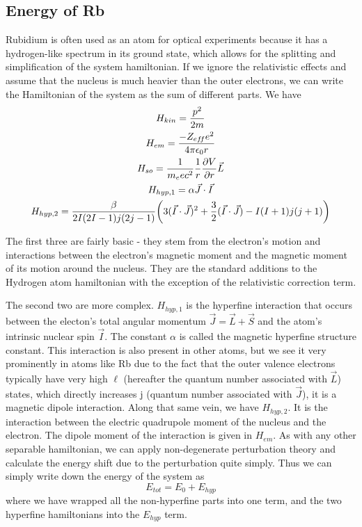 \documentclass{article}
\DeclarePairedDelimiter{\parens}{\lparen}{\rparen}
\begin{document}
  \subsection{Energy of Rb}
  Rubidium is often used as an atom for optical experiments because it has a hydrogen-like spectrum in its ground state, which allows for the splitting and simplification of the system hamiltonian.  If we ignore the relativistic effects and assume that the nucleus is much heavier than the outer electrons, we can write the Hamiltonian of the system as the sum of different parts.  We have
  \begin{gather*}
    H_{kin} = \frac{p^2}{2m} \\
    H_{em} = \frac{-Z_{ef\!f}e^2}{4\pi\epsilon_0r} \\
    H_{so} = \frac{1}{m_e e c^2}\frac{1}{r}\pdv{V}{r}\vec{L} \\
    H_{hyp, 1} = \alpha \vec{J}\cdot\vec{I} \\
    H_{hyp, 2} = \frac{\beta}{2I(2I-1)j(2j-1)}\parens*{3(\vec{I}\cdot\vec{J})^2 + \frac{3}{2}(\vec{I}\cdot\vec{J}) - I(I+1)j(j+1)}
  \end{gather*}

  The first three are fairly basic - they stem from the electron's motion and interactions between the electron's magnetic moment and the magnetic moment of its motion around the nucleus.  They are the standard additions to the Hydrogen atom hamiltonian with the exception of the relativistic correction term.

  \hspace{.25cm}

  The second two are more complex.  $H_{hyp, 1}$ is the hyperfine interaction that occurs between the electon's total angular momentum $\vec{J} = \vec{L} + \vec{S}$ and the atom's intrinsic nuclear spin $\vec{I}$.  The constant $\alpha$ is called the magnetic hyperfine structure constant.  This interaction is also present in other atoms, but we see it very prominently in atoms like Rb due to the fact that the outer valence electrons typically have very high $\ell$ (hereafter the quantum number associated with $\vec{L}$) states, which directly increases j (quantum number associated with $\vec{J}$), it is a magnetic dipole interaction.  Along that same vein, we have $H_{hyp, 2}$.  It is the interaction between the electric quadrupole moment of the nucleus and the electron.  The dipole moment of the interaction is given in $H_{em}$.  As with any other separable hamiltonian, we can apply non-degenerate perturbation theory and calculate the energy shift due to the perturbation quite simply.  Thus we can simply write down the energy of the system as
  \begin{equation*}
    E_{tot} = E_0 + E_{hyp}
  \end{equation*}
  where we have wrapped all the non-hyperfine parts into one term, and the two hyperfine hamiltonians into the $E_{hyp}$ term.
\end{document}
